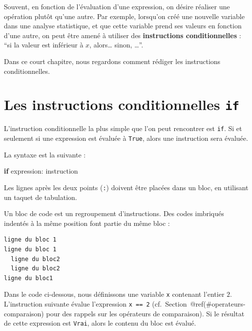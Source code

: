 \documentclass[
  12pt,
]{book}
\newenvironment{Shaded}{\begin{snugshade}}{\end{snugshade}}
\newcommand{\ControlFlowTok}[1]{\textcolor[rgb]{0.13,0.29,0.53}{\textbf{#1}}}
\newcommand{\NormalTok}[1]{#1}
\numberwithin{equation}{section}
\newcounter{countremarque}
\newenvironment{remarque}{%
 \refstepcounter{countremarque}
    \begin{tcolorbox}[width=\linewidth, colback=blue!3, boxrule=0.5pt,arc=0pt,title = Remarque \thecountremarque]
    }%
    {
    \end{tcolorbox}
    }
\numberwithin{countremarque}{section}
\begin{document}
Souvent, en fonction de l'évaluation d'une expression, on désire réaliser une opération plutôt qu'une autre. Par exemple, lorsqu'on créé une nouvelle variable dans une analyse statistique, et que cette variable prend ses valeurs en fonction d'une autre, on peut être amené à utiliser des \textbf{instructions conditionnelles} : ``si la valeur est inférieur à \(x\), alors\ldots{} sinon, \ldots{}''.

Dans ce court chapitre, nous regardons comment rédiger les instructions conditionnelles.

\section{\texorpdfstring{Les instructions conditionnelles \texttt{if}}{Les instructions conditionnelles if}}\label{les-instructions-conditionnelles-if}

L'instruction conditionnelle la plus simple que l'on peut rencontrer est \texttt{if}. Si et seulement si une expression est évaluée à \texttt{True}, alors une instruction sera évaluée.

La syntaxe est la suivante :

\begin{Shaded}
\begin{Highlighting}[]
\ControlFlowTok{if}\NormalTok{ expression:}
\NormalTok{  instruction}
\end{Highlighting}
\end{Shaded}

Les lignes après les deux points (\texttt{:}) doivent être placées dans un bloc, en utilisant un taquet de tabulation.

\begin{remarque}
Un bloc de code est un regroupement d'instructions. Des codes imbriqués indentés à la même position font partie du même bloc :

\begin{lstlisting}
ligne du bloc 1
ligne du bloc 1
  ligne du bloc2
  ligne du bloc2
ligne du bloc1
\end{lstlisting}
\end{remarque}

Dans le code ci-dessous, nous définissons une variable \texttt{x} contenant l'entier \(2\). L'instruction suivante évalue l'expression \texttt{x\ ==\ 2} (cf.~Section~@ref(\#operateurs-comparaison) pour des rappels sur les opérateurs de comparaison). Si le résultat de cette expression est \texttt{Vrai}, alors le contenu du bloc est évalué.
\end{document}
